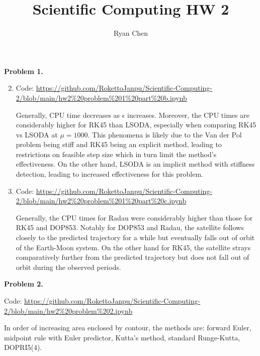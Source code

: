 \documentclass{article}
\title{Scientific Computing HW 2}
\author{Ryan Chen}
\def\tbf#1{\textbf{#1}}
\newcommand{\ep}{\epsilon}
\newcommand{\sep}[1][.5cm]{\vspace{#1}}
\begin{document}
	
\maketitle



\tbf{Problem 1.} 

\begin{enumerate}[label=(\alph*)]\setcounter{enumi}{1}

\item Code: \url{https://github.com/RokettoJanpu/Scientific-Computing-2/blob/main/hw2%20problem%201%20part%20b.ipynb}

Generally, CPU time decreases as $\ep$ increases. Moreover, the CPU times are considerably higher for RK45 than LSODA, especially when comparing RK45 vs LSODA at $\mu=1000$. This phenomena is likely due to the Van der Pol problem being stiff and RK45 being an explicit method, leading to restrictions on feasible step size which in turn limit the method's effectiveness. On the other hand, LSODA is an implicit method with stiffness detection, leading to increased effectiveness for this problem.

\item Code: \url{https://github.com/RokettoJanpu/Scientific-Computing-2/blob/main/hw2%20problem%201%20part%20c.ipynb}

Generally, the CPU times for Radau were considerably higher than those for RK45 and DOP853. Notably for DOP853 and Radau, the satellite follows closely to the predicted trajectory for a while but eventually falls out of orbit of the Earth-Moon system. On the other hand for RK45, the satellite strays comparatively further from the predicted trajectory but does not fall out of orbit during the observed periods.
	
\end{enumerate}
\sep



\tbf{Problem 2.}

Code: \url{https://github.com/RokettoJanpu/Scientific-Computing-2/blob/main/hw2%20problem%202.ipynb}

In order of increasing area enclosed by contour, the methods are: forward Euler, midpoint rule with Euler predictor, Kutta's method, standard Runge-Kutta, DOPRI5(4).
\end{document}
